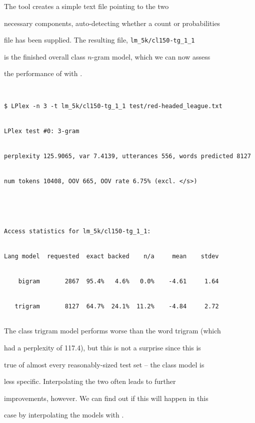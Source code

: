 The  tool creates a simple text file pointing to the two


necessary components, auto-detecting whether a count or probabilities


file has been supplied.  The resulting file, {\tt lm\_5k/cl150-tg\_1\_1}


is the finished overall class $n$-gram model, which we can now assess


the performance of with .


\begin{verbatim}


$ LPlex -n 3 -t lm_5k/cl150-tg_1_1 test/red-headed_league.txt


LPlex test #0: 3-gram


perplexity 125.9065, var 7.4139, utterances 556, words predicted 8127


num tokens 10408, OOV 665, OOV rate 6.75% (excl. </s>)





Access statistics for lm_5k/cl150-tg_1_1:


Lang model  requested  exact backed    n/a     mean    stdev


    bigram       2867  95.4%   4.6%   0.0%    -4.61     1.64


   trigram       8127  64.7%  24.1%  11.2%    -4.84     2.72


\end{verbatim} %





The class trigram model performs worse than the word trigram (which


had a perplexity of 117.4), but this is not a surprise since this is


true of almost every reasonably-sized test set -- the class model is


less specific.  Interpolating the two often leads to further


improvements, however.  We can find out if this will happen in this


case by interpolating the models with .


